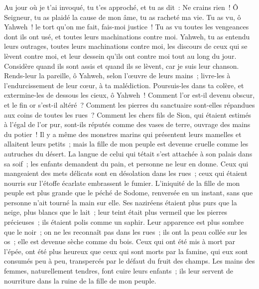 \begin{multicols}{2}
Au jour où je t'ai invoqué, tu t'es approché, et tu as dit~: Ne crains rien~!
 Ô Seigneur, tu as plaidé la cause de mon âme, tu as racheté ma vie.
Tu as vu, ô Yahweh~! le tort qu'on me fait, fais-moi justice~!
Tu as vu toutes les vengeances dont ils ont usé, et toutes leurs machinations contre moi.
 Yahweh, tu as entendu leurs outrages, toutes leurs machinations contre moi,
les discours de ceux qui se lèvent contre moi, et leur dessein qu'ils ont contre moi tout au long du jour.
Considère quand ils sont assis et quand ils se lèvent, car je suis leur chanson.
 Rends-leur la pareille, ô Yahweh, selon l'œuvre de leurs mains~;
livre-les à l'endurcissement de leur cœur, à ta malédiction.
Poursuis-les dans ta colère, et extermine-les de dessous les cieux, ô Yahweh~!
\VerseOne{} Comment l'or est-il devenu obscur, et le fin or s'est-il altéré~? Comment les pierres du sanctuaire sont-elles répandues aux coins de toutes les rues~?
 Comment les chers fils de Sion, qui étaient estimés à l'égal de l'or pur, sont-ils réputés comme des vases de terre, ouvrage des mains du potier~!
 Il y a même des monstres marins qui présentent leurs mamelles et allaitent leurs petits~; mais la fille de mon peuple est devenue cruelle comme les autruches du désert.
 La langue de celui qui tétait s'est attachée à son palais dans sa soif~; les enfants demandent du pain, et personne ne leur en donne.
 Ceux qui mangeaient des mets délicats sont en désolation dans les rues~; ceux qui étaient nourris sur l'étoffe écarlate embrassent le fumier.
 L'iniquité de la fille de mon peuple est plus grande que le péché de Sodome, renversée en un instant, sans que personne n'ait tourné la main sur elle.
 Ses naziréens étaient plus purs que la neige, plus blancs que le lait~; leur teint était plus vermeil que les pierres précieuses~; ils étaient polis comme un saphir.
 Leur apparence est plus sombre que le noir~; on ne les reconnaît pas dans les rues~; ils ont la peau collée sur les os~; elle est devenue sèche comme du bois.
 Ceux qui ont été mis à mort par l'épée, ont été plus heureux que ceux qui sont morts par la famine, qui eux sont consumés peu à peu, transpercés par le défaut du fruit des champs.
 Les mains des femmes, naturellement tendres, font cuire leurs enfants~; ils leur servent de nourriture dans la ruine de la fille de mon peuple.

\end{multicols}
